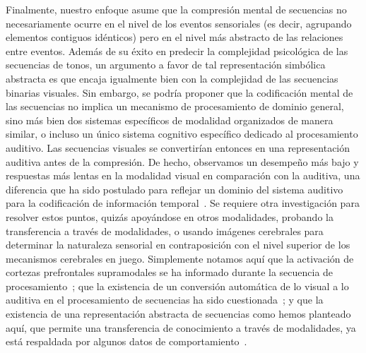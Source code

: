 Finalmente, nuestro enfoque asume que la compresión mental de secuencias no necesariamente ocurre en el nivel de los eventos sensoriales (es decir, agrupando elementos contiguos idénticos) pero en el nivel más abstracto de las relaciones entre eventos. Además de su éxito en predecir la complejidad psicológica de las secuencias de tonos, un argumento a favor de tal representación simbólica abstracta es que encaja igualmente bien con la complejidad de las secuencias binarias visuales. Sin embargo, se podría proponer que la codificación mental de las secuencias no implica un mecanismo de procesamiento de dominio general, sino más bien dos sistemas específicos de modalidad organizados de manera similar, o incluso un único sistema cognitivo específico dedicado al procesamiento auditivo. Las secuencias visuales se convertirían entonces en una representación auditiva antes de la compresión. De hecho, observamos un desempeño más bajo y respuestas más lentas en la modalidad visual en comparación con la auditiva, una diferencia que ha sido postulado para reflejar un dominio del sistema auditivo para la codificación de información temporal~\cite{f91,f118,f119}. Se requiere otra investigación para resolver estos puntos, quizás apoyándose en otros modalidades, probando la transferencia a través de modalidades, o usando imágenes cerebrales para determinar la naturaleza sensorial en contraposición con el nivel superior de los mecanismos cerebrales en juego. Simplemente notamos aquí que la activación de cortezas prefrontales supramodales se ha informado durante la secuencia de procesamiento~\cite{f19,f60}; que la existencia de un conversión automática de lo visual a lo auditiva en el procesamiento de secuencias ha sido cuestionada~\cite{f121}; y que la existencia de una representación abstracta de secuencias como hemos planteado aquí, que permite una transferencia de conocimiento a través de modalidades, ya está respaldada por algunos datos de comportamiento~\cite{yildirim2015learning}.

